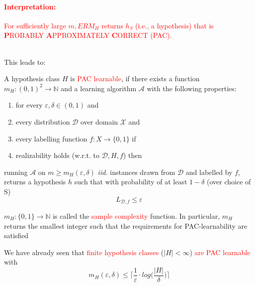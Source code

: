 \documentclass[10pt,a4paper]{article}
\theoremstyle{definition}
\theoremstyle{plain}
\begin{document}
\textcolor{red}{\paragraph{Interpretation:} For sufficiently large $m, ERM_H$ returns $h_S$ (i.e., a hypothesis) that is \textbf{P}ROBABLY \textbf{A}PPROXIMATELY \textbf{C}ORRECT (PAC).}\\
\newline
This leads to:
\begin{boxeddef}
	A hypothesis class $H$ is \textcolor{red}{PAC learnable}, if there exists a function $m_H: (0,1)^2 \to \mathbb{N}$ and a learning algorithm $\mathcal{A}$ with the following properties:
	\begin{enumerate}
		\item for every $\varepsilon, \delta \in (0,1)$ and
		\item every distribution $\mathcal{D}$ over domain $\mathcal{X}$ and
		\item every labelling function $f: X \to \{0, 1\}$ if
		\item realizability holds (w.r.t. to $\mathcal{D}, H, f$) then
	\end{enumerate}
	running $\mathcal{A}$ on $m \geq m_H(\varepsilon, \delta)$ \textit{iid.} instances drawn from $\mathcal{D}$ and labelled by $f$, returns a hypothesis $h$ such that with probability of at least $1-\delta$ (over choice of S) 
	$$ L_{\mathcal{D}, f} \leq \varepsilon $$
\end{boxeddef}
\begin{boxedsubdef}
	$m_H: \{0,1\} \to \mathbb{N}$ is called the \textcolor{red}{sample complexity} function. In particular, $m_H$ returns the smallest integer such that the requirements for PAC-learnability are satisfied
\end{boxedsubdef}
We have already seen that \textcolor{red}{finite hypothesis classes} ($|H| < \infty$) \textcolor{red}{are PAC learnable} with 
$$ m_H(\varepsilon, \delta) \leq \bigg\lceil\frac{1}{\varepsilon} \cdot log \bigg( \frac{|H|}{\delta}\bigg) \bigg\rceil $$
\end{document}
